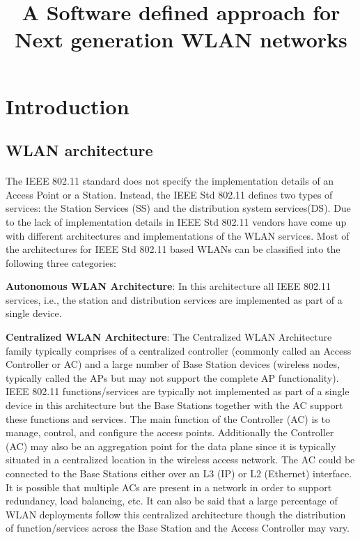 \documentclass[12pt]{article}
\begin{document}
\title{A Software defined approach for Next generation WLAN networks}

	
\section{Introduction}
\subsection{WLAN architecture}
\paragraph{}
The IEEE 802.11 standard does not specify the implementation details of an Access Point or a Station. Instead, the IEEE Std 802.11 defines two types of services: the Station Services (SS) and the distribution system services(DS). Due to the lack of implementation details in IEEE Std 802.11 vendors have come up with different architectures and implementations of the WLAN services. Most of the architectures for IEEE Std 802.11 based WLANs can be classified into the following three categories: 

 

    \textbf{Autonomous WLAN Architecture}: In this architecture all IEEE 802.11 services, i.e., the station and distribution services are implemented as part of a single device.  

    \textbf{Centralized WLAN Architecture}: The Centralized WLAN Architecture family typically comprises of a centralized controller (commonly called an Access Controller or AC) and a large number of Base Station devices (wireless nodes, typically called the APs but may not support the complete AP functionality). IEEE 802.11 functions/services are typically not implemented as part of a single device in this architecture but the Base Stations together with the AC support these functions and services. The main function of the Controller (AC) is to manage, control, and configure the access points. Additionally the Controller (AC) may also be an aggregation point for the data plane since it is typically situated in a centralized location in the wireless access network. The AC could be connected to the Base Stations either over an L3 (IP) or L2 (Ethernet) interface. It is possible that multiple ACs are present in a network in order to support redundancy, load balancing, etc. It can also be said that a large percentage of WLAN deployments follow this centralized architecture though the distribution of function/services across the Base Station and the Access Controller may vary. 
\end{document}
